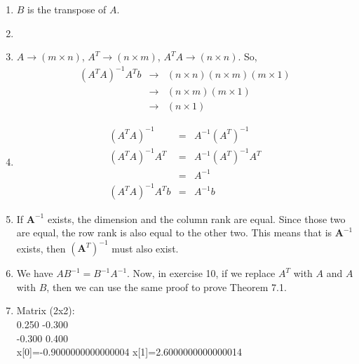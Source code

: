 \documentclass{article}
\begin{document}
\begin{enumerate}
\item $B$ is the transpose of $A$. 

\item 

\item $A \rightarrow (m \times n)$, $A^T \rightarrow (n \times m)$, $A^TA \rightarrow (n \times n)$. So, \\
\begin{eqnarray*}
	(A^TA)^{-1}A^Tb &\rightarrow& (n \times n)(n \times m)(m \times 1)\\
	&\rightarrow& (n \times m)(m \times 1)\\
	&\rightarrow& (n \times 1)
\end{eqnarray*}

\item 
\begin{eqnarray*}
	(A^TA)^{-1} &=& A^{-1}(A^T)^{-1}\\
	(A^TA)^{-1}A^T &=& A^{-1}(A^T)^{-1}A^T\\
	&=& A^{-1}\\
	(A^TA)^{-1}A^Tb &=& A^{-1}b
\end{eqnarray*}

\item If $\textbf{A}^{-1}$ exists, the dimension and the column rank are equal. Since those two are equal, the row rank is also equal to the other two. This means that is $\textbf{A}^{-1}$ exists, then $\left(\textbf{A}^{T}\right)^{-1}$ must also exist.

\item We have $AB^{-1} = B^{-1}A^{-1}$. Now, in exercise 10, if we replace $A^T$ with $A$ and $A$ with $B$, then we can use the same proof to prove Theorem 7.1. 

\item Matrix (2x2):\\
	0.250 -0.300\\
	-0.300  0.400\\
	x[0]=-0.9000000000000004 x[1]=2.6000000000000014\\
	

\end{enumerate}
\end{document}
